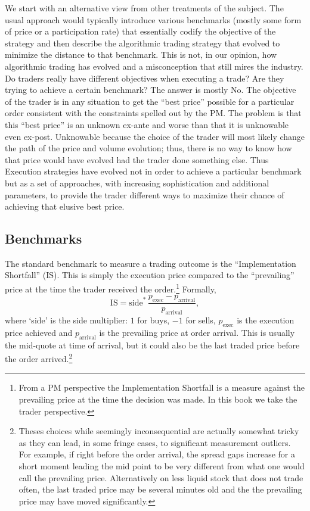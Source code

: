 We start with an alternative view from other treatments of the subject. The usual approach would typically introduce various benchmarks (mostly some form of price or a participation rate) that essentially codify the objective of the strategy and then describe the algorithmic trading strategy that evolved to minimize the distance to that benchmark. This is not, in our opinion, how algorithmic trading has evolved and a misconception that still mires the industry. Do traders really have different objectives when executing a trade? Are they trying to achieve a certain benchmark? The answer is mostly No. The objective of the trader is in any situation to get the ``best price'' possible for a particular order consistent with the constraints spelled out by the PM. The problem is that this ``best price''  is an unknown ex-ante and worse than that it is unknowable even ex-post. Unknowable because the choice of the trader will most likely change the path of the price and volume evolution; thus, there is no way to know how that price would have evolved had the trader done something else. Thus Execution strategies have evolved not in order to achieve a particular benchmark but as a set of approaches, with increasing sophistication and additional parameters, to provide the trader different ways to maximize their chance of achieving that elusive best price.



\subsection{Benchmarks \label{s:benchmarks}}

The standard benchmark to measure a trading outcome is the ``Implementation Shortfall'' (IS). This is simply the execution price compared to the ``prevailing'' price at the time the trader received the order.\footnote{From a PM perspective the Implementation Shortfall is a measure against the prevailing price at the time the decision was made. In this book we take the trader perspective.} Formally,
        \begin{equation}
        \text{IS} = \text{side}^*\, \frac{p_{\text{exec}} - p_{\text{arrival}}}{p_{\text{arrival}}},
        \end{equation}
where `side' is the side multiplier: $1$ for buys, $-1$ for sells, $p_{\text{exec}}$ is the execution price achieved and $p_{\text{arrival}}$ is the prevailing price at order arrival. This is usually the mid-quote at time of arrival, but it could also be the last traded price before the order arrived.\footnote{Theses choices while seemingly inconsequential are actually somewhat tricky as they can lead, in some fringe cases, to significant measurement outliers. For example, if right before the order arrival, the spread gaps increase for a short moment leading the mid point to be very different from what one would call the prevailing price. Alternatively on less liquid stock that does not trade often, the last traded price may be several minutes old and the the prevailing price may have moved significantly.}



